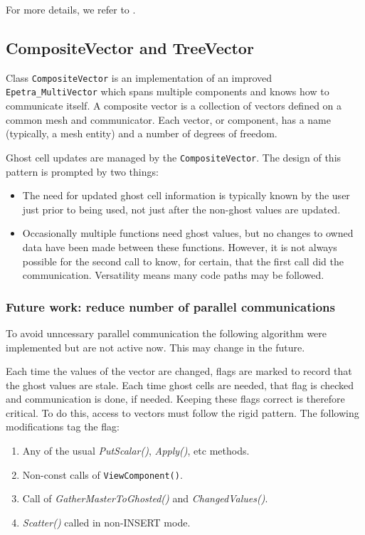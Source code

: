 For more details, we refer to \cite{coon2016managing}.


\subsection{CompositeVector and TreeVector}

Class {\tt CompositeVector} is an implementation of an improved
{\tt Epetra\_MultiVector} which spans multiple components and knows how to
communicate itself.
A composite vector is a collection of vectors defined on a common mesh and
communicator. 
Each vector, or component, has a name (typically, a mesh entity)
and a number of degrees of freedom.  

Ghost cell updates are managed by the {\tt CompositeVector}. 
The design of this pattern is prompted by two things:
\begin{itemize}
\item The need for updated ghost cell information is typically known by the
      user just prior to being used, not just after the non-ghost values are
      updated.
\item Occasionally multiple functions need ghost values, but no changes to
      owned data have been made between these functions.  However, it is not
      always possible for the second call to know, for certain, that the first
      call did the communication.  Versatility means many code paths may be
      followed.
\end{itemize}

\subsubsection{Future work: reduce number of parallel communications}
To avoid unncessary parallel communication the following algorithm were implemented
but are not active now.
This may change in the future.

Each time the values of the vector are changed, flags are marked to
record that the ghost values are stale.
Each time ghost cells are needed, that flag is checked and communication
is done, if needed.
Keeping these flags correct is therefore critical. 
To do this, access to vectors must follow the rigid pattern.
The following modifications tag the flag:

\begin{enumerate}
\item Any of the usual {\it PutScalar()}, {\it Apply()}, etc methods.
\item Non-const calls of {\tt ViewComponent()}.
\item Call of {\it GatherMasterToGhosted()} and {\it ChangedValues()}.
\item {\it Scatter()} called in non-INSERT mode.
\end{enumerate}

